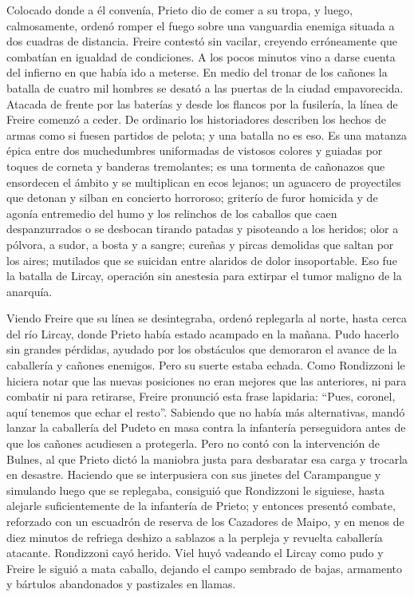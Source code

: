 \documentclass[10pt,twoside,openright]{memoir}
\begin{document}
Colocado donde a él convenía, Prieto dio de comer a su tropa, y luego,
calmosamente, ordenó romper el fuego sobre una vanguardia enemiga
situada a dos cuadras de distancia.
Freire contestó sin vacilar, creyendo erróneamente que combatían en
igualdad de condiciones. A los pocos minutos vino a darse cuenta del
infierno en que había ido a meterse. En medio del tronar de los cañones
la batalla de cuatro mil hombres se desató a las puertas de la ciudad
empavorecida. Atacada de frente por las baterías y desde los flancos por
la fusilería, la línea de Freire comenzó a ceder. De ordinario los
historiadores describen los hechos de armas como si fuesen partidos de
pelota; y una batalla no es eso. Es una matanza épica entre dos
muchedumbres uniformadas de vistosos colores y guiadas por toques de
corneta y banderas tremolantes; es una tormenta de cañonazos que
ensordecen el ámbito y se multiplican en ecos lejanos; un aguacero de
proyectiles que detonan y silban en concierto horroroso; griterío de
furor homicida y de agonía entremedio del humo y los relinchos de los
caballos que caen despanzurrados o se desbocan tirando patadas y
pisoteando a los heridos; olor a pólvora, a sudor, a bosta y a sangre;
cureñas y pircas  demolidas que
saltan por los aires; mutilados que se suicidan entre alaridos de dolor
insoportable. Eso fue la batalla de Lircay, operación sin anestesia para
extirpar el tumor maligno de la
anarquía.

Viendo Freire que su línea se desintegraba, ordenó replegarla al norte,
hasta cerca del río Lircay, donde Prieto había estado acampado en la
mañana. Pudo hacerlo sin grandes pérdidas, ayudado por los obstáculos
que demoraron el avance de la caballería y cañones enemigos. Pero su
suerte estaba echada. Como Rondizzoni le hiciera notar que las nuevas
 posiciones no eran mejores que las
anteriores, ni para combatir ni para retirarse, Freire pronunció esta
frase lapidaria: ``Pues, coronel, aquí tenemos que echar
el resto''. Sabiendo que no había más
alternativas, mandó lanzar la caballería del Pudeto en masa contra la
infantería perseguidora antes de que los cañones acudiesen a protegerla.
Pero no contó con la intervención de Bulnes, al que Prieto dictó la
maniobra justa para desbaratar esa carga y trocarla en
 desastre. Haciendo que se
interpusiera con sus jinetes del Carampangue y simulando luego que se
replegaba, consiguió que Rondizzoni le siguiese, hasta alejarle
suficientemente de la infantería de Prieto; y entonces presentó combate,
reforzado con un escuadrón de reserva de los Cazadores de Maipo, y en
menos de diez minutos de refriega deshizo a sablazos a la perpleja y
revuelta caballería atacante. Rondizzoni cayó herido. Viel huyó vadeando
el Lircay como pudo y Freire le siguió a mata caballo, dejando el campo
sembrado de bajas, armamento y bártulos abandonados y pastizales en
llamas.
\end{document}
